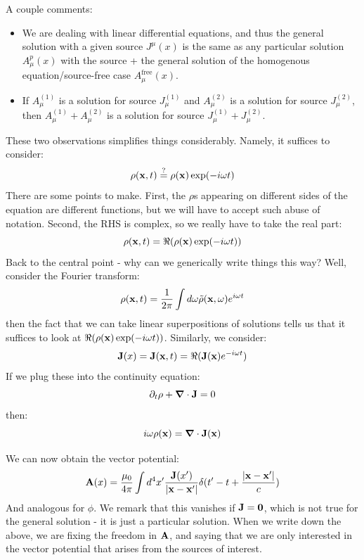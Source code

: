 A couple comments:
\begin{itemize}
    \item We are dealing with linear differential equations, and thus the general solution with a given source $J^\mu(x)$ is the same as any particular solution $A_\mu^{p}(x)$ with the source + the general solution of the homogenous equation/source-free case $A_\mu^{\text{free}}(x)$.
    \item If $A_\mu^{(1)}$ is a solution for source $J_\mu^{(1)}$ and $A_\mu^{(2)}$ is a solution for source $J_\mu^{(2)}$, then $A_\mu^{(1)} + A_\mu^{(2)}$ is a solution for source $J_\mu^{(1)} + J_\mu^{(2)}$.
\end{itemize}
These two observations simplifies things considerably. Namely, it suffices to consider:
\begin{equation}
    \rho(\mathbf{x}, t) \stackrel{?}{=} \rho(\mathbf{x})\exp(-i\omega t)
\end{equation}
There are some points to make. First, the $\rho$s appearing on different sides of the equation are different functions, but we will have to accept such abuse of notation. Second, the RHS is complex, so we really have to take the real part:
\begin{equation}
    \rho(\mathbf{x}, t) = \Re(\rho(\mathbf{x})\exp(-i\omega t))
\end{equation}
Back to the central point - why can we generically write things this way? Well, consider the Fourier transform:
\begin{equation}
    \rho(\mathbf{x}, t) = \frac{1}{2\pi}\int d\omega \tilde{\rho}(\mathbf{x}, \omega)e^{i\omega t}
\end{equation}
then the fact that we can take linear superpositions of solutions tells us that it suffices to look at $\Re(\rho(\mathbf{x})\exp(-i\omega t))$. Similarly, we consider:
\begin{equation}
    \mathbf{J}(x) = \mathbf{J}(\mathbf{x}, t) = \Re(\mathbf{J}(\mathbf{x})e^{-i\omega t})
\end{equation}
If we plug these into the continuity equation:
\begin{equation}
    \p_t \rho + \nabla \cdot \v{J} = 0
\end{equation}
then:
\begin{equation}
    i\omega \rho(\v{x}) = \nabla \cdot \v{J}(\v{x})
\end{equation}

We can now obtain the vector potential:
\begin{equation}
    \mathbf{A}(x) = \frac{\mu_0}{4\pi}\int d^4x' \frac{\mathbf{J}(x')}{\lvert \mathbf{x} - \mathbf{x}' \rvert}\delta(t' - t + \frac{\lvert \mathbf{x} - \mathbf{x}' \rvert}{c})
\end{equation}
And analogous for $\phi$. We remark that this vanishes if $\mathbf{J} = \mathbf{0}$, which is not true for the general solution - it is just a particular solution. When we write down the above, we are fixing the freedom in $\mathbf{A}$, and saying that we are only interested in the vector potential that arises from the sources of interest.

